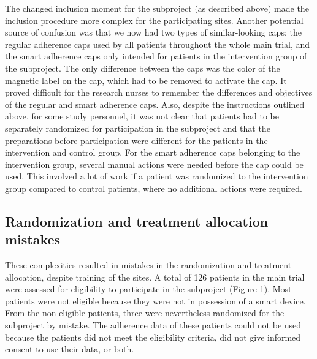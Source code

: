 \documentclass[twocolumn, issue, empirical, authordate]{jote-new-article}
\begin{document}
 The changed inclusion moment for the subproject (as described above)
made the inclusion procedure more complex for the participating sites.
 Another potential source of confusion was that we now had two types of similar-looking caps: the regular adherence caps used by all patients throughout the whole main trial, and the smart adherence caps only intended for patients in the intervention group of the subproject. The only difference between the caps was the color of the magnetic label on the cap, which had to be removed to activate the cap. It proved difficult for the research nurses to remember the differences and objectives of the regular and smart adherence caps.
 Also, despite the instructions outlined above, for some study personnel, it was not clear that patients had to be separately randomized for participation in the subproject and that the preparations before participation were different for the patients in the intervention and control group. For the smart adherence caps belonging to the intervention group, several manual actions were needed before the cap could be used. This involved a lot of work if a patient was randomized to the intervention group compared to control patients, where no additional actions were required.



\subsection{Randomization and treatment allocation mistakes}

 These complexities resulted in mistakes in the randomization and treatment allocation, despite training of the sites. A total of 126 patients in the main trial were assessed for eligibility to participate in the subproject (Figure 1). Most patients were not eligible because they were not in possession of a smart device. From the non-eligible patients, three were nevertheless randomized for the subproject by mistake. The adherence data of these patients could not be used because the patients did not meet the eligibility criteria, did not give informed consent to use their data, or both.
  
\end{document}
